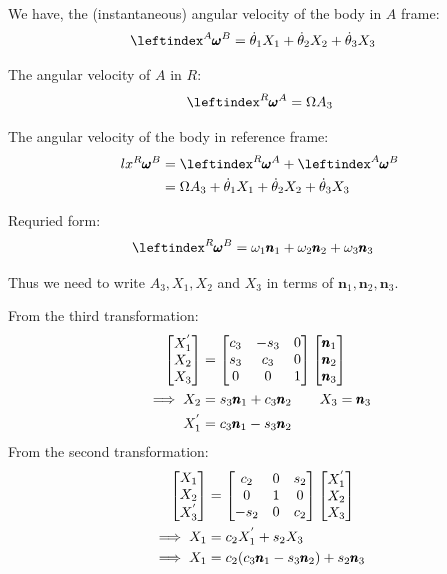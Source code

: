 We have, the (instantaneous) angular velocity of the body in $A$ frame:
\begin{align*}
    \lx{^A}{\pmb \omega}^B &= \dot \theta_1 X_1 + \dot \theta_2 X_2 + \dot \theta_3 X_3
\end{align*}

The angular velocity of $A$ in $R$:
$$ \lx{^R}{\pmb \omega}^A = \Omega A_3$$

The angular velocity of the body in reference frame:
\begin{align*}
    lx{^R}{\pmb \omega}^B &= \lx{^R}{\pmb \omega}^A + \lx{^A}{\pmb \omega}^B\\
        &= \Omega A_3 +\dot \theta_1 X_1 + \dot \theta_2 X_2 + \dot \theta_3 X_3
\end{align*}

Requried form:
\begin{align*}
    \lx{^R}{\pmb \omega}^B &= \omega_1 \pmb n_1 + \omega_2 \pmb n_2 + \omega_3 \pmb n_3
\end{align*}

Thus we need to write $A_3, X_1, X_2$ and $X_3$ in terms of $\pmb n_1, \pmb n_2, \pmb n_3$.

\begin{multicols}{2}
From the third transformation:
\begin{align*}
    \begin{bmatrix} X_1^{'}\\ X_2\\ X_3 \end{bmatrix} &=
                    \begin{bmatrix} c_3 & -s_3 & 0\\
                        s_3 & c_3 & 0\\
                        0 & 0 & 1 \end{bmatrix}
    \begin{bmatrix} \pmb n_1 \\ \pmb n_2 \\ \pmb n_3 \end{bmatrix}\\
    \implies X_2 &= s_3 \pmb n_1 + c_3 \pmb n_2 \qquad X_3 = \pmb n_3\\
         X_1^{'} &= c_3 \pmb n_1 - s_3 \pmb n_2
\end{align*}
From the second transformation:
\begin{align*}
    \begin{bmatrix} X_1\\ X_2\\ X_3^{'} \end{bmatrix} &=
        \begin{bmatrix} c_2 & 0 & s_2\\
            0 & 1 & 0\\
            -s_2 & 0 & c_2 \end{bmatrix}
    \begin{bmatrix} X_1^{'}\\ X_2\\ X_3 \end{bmatrix}\\
    \implies X_1 &= c_2 X_1^{'} + s_2 X_3\\
    \implies X_1 &= c_2(c_3 \pmb n_1 - s_3 \pmb n_2) + s_2 \pmb n_3
\end{align*}
\end{multicols}

